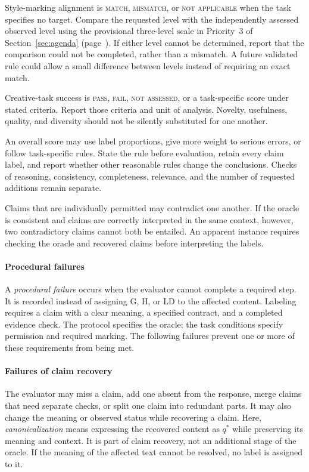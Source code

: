 \documentclass{clv2025}
\newcommand{\LD}{\textsc{LD}}
\newcommand{\Hall}{\textsc{H}}
\newcommand{\Grd}{\textsc{G}}
\begin{document}
Style-marking alignment is \textsc{match}, \textsc{mismatch}, or
\textsc{not applicable} when the task specifies no target. Compare the requested
level with the independently assessed observed level using the provisional
three-level scale in Priority~3 of Section~\ref{sec:agenda}
(page~\pageref{par:style-scale}). If either level cannot be determined,
report that the comparison could not be completed, rather than a mismatch.
A future validated rule could allow a small difference between levels
instead of requiring an exact match.

Creative-task success is \textsc{pass}, \textsc{fail}, \textsc{not assessed},
or a task-specific score under stated criteria. Report those criteria and
unit of analysis. Novelty, usefulness, quality, and diversity should not be
silently substituted for one another.

An overall score may use label proportions, give more weight to serious
errors, or follow task-specific rules. State the rule before evaluation,
retain every claim label, and report whether other reasonable rules change
the conclusions. Checks of reasoning, consistency, completeness, relevance,
and the number of requested additions remain separate.

Claims that are individually permitted may contradict one another. If the
oracle is consistent and claims are correctly interpreted in the same context,
however, two contradictory claims cannot both be entailed. An apparent instance
requires checking the oracle and recovered claims before interpreting the labels.

\paragraph{Procedural failures}

A \emph{procedural failure} occurs when the evaluator cannot complete a
required step. It is recorded instead of assigning \Grd, \Hall, or \LD{} to
the affected content. Labeling requires a claim with a clear meaning, a
specified contract, and a completed evidence check. The protocol specifies
the oracle; the task conditions specify permission and required marking.
The following failures prevent one or more of these requirements from being met.

\paragraph{Failures of claim recovery}
The evaluator may miss a claim, add one absent from the response, merge claims
that need separate checks, or split one claim into redundant parts. It may
also change the meaning or observed status while recovering a claim.
Here, \emph{canonicalization} means expressing the recovered content as
$q^*$ while preserving its meaning and context. It is part of claim recovery,
not an additional stage of the oracle. If the meaning of the affected text
cannot be resolved, no label is assigned to it.
\end{document}
